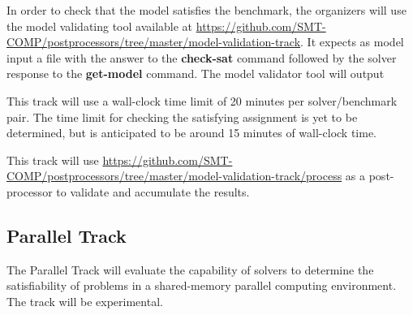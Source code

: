 \documentclass[12pt]{article}
\newcommand{\akey}[1]{\textbf{#1}\xspace}
\newcommand{\paralleltrack}{Parallel Track\xspace}
\begin{document}
In order to check that the model satisfies the benchmark, the organizers will
use the model validating tool available at
{\url{https://github.com/SMT-COMP/postprocessors/tree/master/model-validation-track}}.
It expects as model input a file with the answer to the \akey{check-sat}
command followed by the solver response to the \akey{get-model} command.
The model validator tool will output

This track will use a wall-clock time limit of 20 minutes per solver/benchmark
pair. The time limit for checking the satisfying assignment is yet to be
determined, but is anticipated to be around 15 minutes of wall-clock time.

This track will use
{\url{https://github.com/SMT-COMP/postprocessors/tree/master/model-validation-track/process}}
as a post-processor
to validate and accumulate the results.


\subsection{\paralleltrack{}}
The \paralleltrack{} will evaluate the capability of solvers to
determine the satisfiability of problems in a shared-memory parallel
computing environment.  The track will be experimental.
\end{document}
